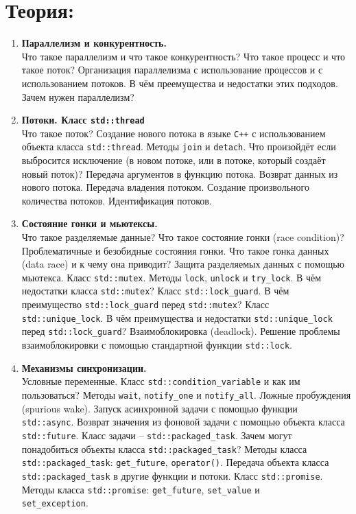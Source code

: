 \documentclass{article}
\begin{document}

\section*{Теория:}
\begin{enumerate}


\item \textbf{Параллелизм и конкурентность.}\\
Что такое параллелизм и что такое конкурентность? Что такое процесс и что такое поток? Организация параллелизма с использование процессов и с использованием потоков. В чём преемущества и недостатки этих подходов. Зачем нужен параллелизм?

\item \textbf{Потоки. Класс \texttt{std::thread}}\\
Что такое поток? Создание нового потока в языке \texttt{C++} с использованием объекта класса \texttt{std::thread}. Методы \texttt{join} и \texttt{detach}. Что произойдёт если выбросится исключение (в новом потоке, или в потоке, который создаёт новый поток)? Передача аргументов в функцию потока. Возврат данных из нового потока. Передача владения потоком. Создание произвольного количества потоков. Идентификация потоков.


\item \textbf{Состояние гонки и мьютексы.}\\
Что такое разделяемые данные? Что такое состояние гонки (race condition)? Проблематичные и безобидные состояния гонки. Что такое гонка данных (data race) и к чему она приводит? Защита разделяемых данных с помощью мьютекса. Класс \texttt{std::mutex}. Методы \texttt{lock}, \texttt{unlock} и \texttt{try\_lock}. В чём недостатки класса \texttt{std::mutex}? Класс \texttt{std::lock\_guard}.  
В чём преимущество \texttt{std::lock\_guard} перед \texttt{std::mutex}? Класс \texttt{std::unique\_lock}. В чём преимущества и недостатки \texttt{std::unique\_lock} перед \texttt{std::lock\_guard}? Взаимоблокировка (deadlock). Решение проблемы взаимоблокировки с помощью стандартной функции \texttt{std::lock}.


\item \textbf{Механизмы синхронизации.}\\
Условные переменные. Класс \texttt{std::condition\_variable} и как им пользоваться? Методы \texttt{wait}, \texttt{notify\_one} и \texttt{notify\_all}. Ложные пробуждения (spurious wake). Запуск асинхронной задачи с помощью функции \texttt{std::async}. Возврат значения из фоновой задачи с помощью объекта класса \texttt{std::future}. Класс задачи -- \texttt{std::packaged\_task}. Зачем могут понадобиться объекты класса \texttt{std::packaged\_task}? Методы класса \texttt{std::packaged\_task}: \texttt{get\_future}, \texttt{operator()}. Передача объекта класса \texttt{std::packaged\_task} в другие функции и потоки. Класс \texttt{std::promise}. Методы класса \texttt{std::promise}: \texttt{get\_future}, \texttt{set\_value} и\\ \texttt{set\_exception}.



\end{enumerate}
\end{document}
